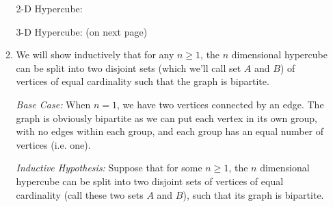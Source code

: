 \begin{enumerate}
\begin{enumerate}
        
        2-D Hypercube:
        
        
        3-D Hypercube: (on next page)
        
        
        \item We will show inductively that for any $n\geq1$, the $n$ dimensional hypercube can be split into two disjoint sets (which we'll call set $A$ and $B$) of vertices of equal cardinality such that the graph is bipartite.
        
        \textit{Base Case:} When $n=1$, we have two vertices connected by an edge. The graph is obviously bipartite as we can put each vertex in its own group, with no edges within each group, and each group has an equal number of vertices (i.e. one).
        
        \textit{Inductive Hypothesis:} Suppose that for some $n\geq1$, the $n$ dimensional hypercube can be split into two disjoint sets of vertices of equal cardinality (call these two sets $A$ and $B$), such that its graph is bipartite. 
        

\end{enumerate}
\end{enumerate}
